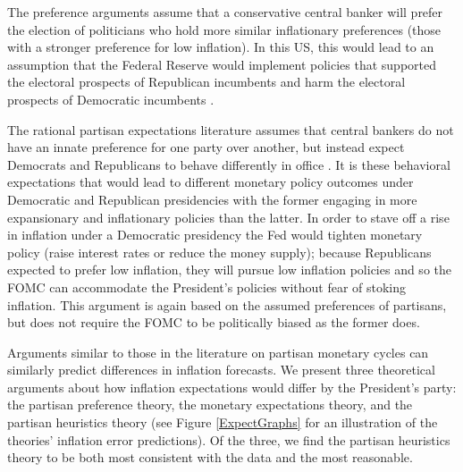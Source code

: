 \documentclass[a4paper]{article}\usepackage{graphicx, color}
\begin{document}
The preference arguments assume that a conservative central banker will prefer the election of politicians who hold more similar inflationary preferences (those with a stronger preference for low inflation). In this US, this would lead to an assumption that the Federal Reserve would implement policies that supported the electoral prospects of Republican incumbents and harm the electoral prospects of Democratic incumbents \citep{Clark2011,Hakes1988,Sieg1997,Tootell1996}.

The rational partisan expectations literature assumes that central bankers do not have an innate preference for one party over another, but instead expect Democrats and Republicans to behave differently in office \citep{Alesina1991,Hibbs1994}. It is these behavioral expectations that would lead to different monetary policy outcomes under Democratic and Republican presidencies with the former engaging in more expansionary and inflationary policies than the latter. In order to stave off a rise in inflation under a Democratic presidency the Fed would tighten monetary policy (raise interest rates or reduce the money supply); because Republicans expected to prefer low inflation, they will pursue low inflation policies and so the FOMC can accommodate the President's policies without fear of stoking inflation. This argument is again based on the assumed preferences of partisans, but does not require the FOMC to be politically biased as the former does. 

Arguments similar to those in the literature on partisan monetary cycles can similarly predict differences in inflation forecasts. We present three theoretical arguments about how inflation expectations would differ by the President's party: the partisan preference theory, the monetary expectations theory, and the partisan heuristics theory (see Figure \ref{ExpectGraphs} for an illustration of the theories' inflation error predictions). Of the three, we find the partisan heuristics theory to be both most consistent with the data and the most reasonable.




\end{document}
